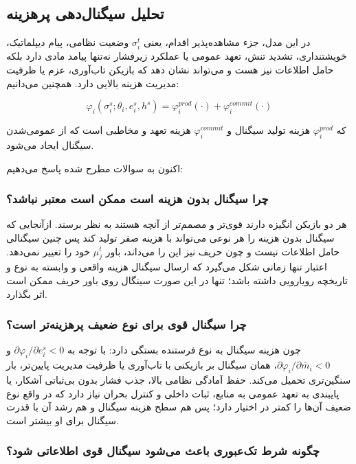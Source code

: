 \documentclass[12pt]{article}
\begin{document}
\subsection{تحلیل سیگنال‌دهی پرهزینه}
در این مدل، جزء مشاهده‌پذیر اقدام، یعنی $\sigma_i^t$
  وضعیت نظامی، پیام دیپلماتیک، خویشتنداری، تشدید تنش، تعهد عمومی یا عملکرد زیرفشار
  نه‌تنها پیامد مادی دارد بلکه حامل اطلاعات نیز هست و می‌تواند 
 نشان دهد که بازیکن تاب‌آوری، عزم یا ظرفیت مدیریت هزینه بالایی دارد.
 همچنین می‌دانیم:
 
 \begin{equation*}
    \varphi_i(\sigma_i^s;\theta_i,e_i^s,h^s) = \varphi_i^{prod}(\cdot) + \varphi_i^{commit}(\cdot)
\end{equation*}

که $\varphi_i^{prod}$ 
هزینه تولید سیگنال و 
$\varphi_i^{commit}$
 هزینه تعهد
  و مخاطبی است که از عمومی‌شدن سیگنال ایجاد می‌شود. 

اکنون به سوالات مطرح شده پاسخ می‌دهیم:

\subsubsection*{چرا سیگنال بدون هزینه است ممکن است معتبر نباشد؟}

هر دو بازیکن انگیزه دارند قوی‌تر و مصمم‌تر از آنچه هستند
 به نظر برسند. ازآنجایی که سیگنال بدون هزینه را هر نوعی می‌تواند با هزینه صفر
 تولید کند پس چنین سیگنالی حامل اطلاعات نیست و چون حریف نیز این را می‌داند، باور 
 $\mu_j^t$
  خود را تغییر نمی‌دهد.
  اعتبار تنها زمانی شکل می‌گیرد که ارسال سیگنال هزینه واقعی و وابسته
  به نوع و تاریخچه رویارویی داشته باشد؛ تنها در این صورت سینگال روی باور حریف ممکن
  است اثر بگذارد.

\subsubsection*{چرا سیگنال قوی برای نوع ضعیف پرهزینه‌تر است؟}

چون هزینه سیگنال به نوع فرستنده بستگی دارد: با توجه به 
$\partial \varphi_i/\partial e_i^s < 0$ و $\partial \varphi_i/\partial \bar{m}_i < 0$، 
همان سیگنال بر بازیکنی با تاب‌آوری یا ظرفیت مدیریت پایین‌تر، بار سنگین‌تری تحمیل می‌کند.
 حفظ آمادگی نظامی بالا، جذب فشار بدون بی‌ثباتی آشکار، یا پایبندی به تعهد عمومی به منابع،
 ثبات داخلی و کنترل بحران نیاز دارد که در واقع نوع ضعیف آن‌ها را کمتر در اختیار دارد؛
 پس هم سطح هزینه سیگنال و هم رشد آن با قدرت سیگنال برای او بیشتر است.

\subsubsection*{چگونه شرط تک‌عبوری باعث می‌شود سیگنال قوی اطلاعاتی شود؟}
\end{document}
